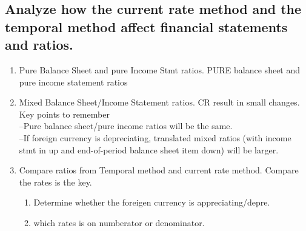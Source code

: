 \documentclass{article}
\newcommand{\be}{\begin{enumerate}}
\newcommand{\ee}{\end{enumerate}}
\begin{document}
\subsection{Analyze how the current rate method and the temporal method affect financial 
statements and ratios.}
\be
    \item Pure Balance Sheet and pure Income Stmt ratios. PURE balance sheet and pure
        income statement ratios 
    \item Mixed Balance Sheet/Income Statement ratios. CR result in small changes.
        \\ Key points to remember
        \\ --Pure balance sheet/pure income ratios will be the same.
        \\ --If foreign currency is depreciating, translated mixed ratios (with
        income stmt in up and end-of-period balance sheet item down) will be larger.
    \item Compare ratios from Temporal method and current rate method. Compare the rates
        is the key.
        \be
            \item Determine whether the foreigen currency is appreciating/depre.
            \item which rates is on numberator or denominator.
        \ee
\ee
\end{document}
